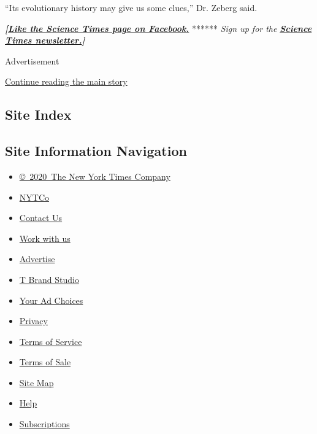 ``Its evolutionary history may give us some clues,'' Dr. Zeberg said.

\textbf{\emph{{[}}\href{http://on.fb.me/1paTQ1h}{\emph{Like the Science
Times page on Facebook.}}} ****** \emph{\textbar{} Sign up for the}
\textbf{\href{http://nyti.ms/1MbHaRU}{\emph{Science Times
newsletter.}}\emph{{]}}}

Advertisement

\protect\hyperlink{after-bottom}{Continue reading the main story}

\hypertarget{site-index}{%
\subsection{Site Index}\label{site-index}}

\hypertarget{site-information-navigation}{%
\subsection{Site Information
Navigation}\label{site-information-navigation}}

\begin{itemize}
\tightlist
\item
  \href{https://help.nytimes3xbfgragh.onion/hc/en-us/articles/115014792127-Copyright-notice}{©~2020~The
  New York Times Company}
\end{itemize}

\begin{itemize}
\tightlist
\item
  \href{https://www.nytco.com/}{NYTCo}
\item
  \href{https://help.nytimes3xbfgragh.onion/hc/en-us/articles/115015385887-Contact-Us}{Contact
  Us}
\item
  \href{https://www.nytco.com/careers/}{Work with us}
\item
  \href{https://nytmediakit.com/}{Advertise}
\item
  \href{http://www.tbrandstudio.com/}{T Brand Studio}
\item
  \href{https://www.nytimes3xbfgragh.onion/privacy/cookie-policy\#how-do-i-manage-trackers}{Your
  Ad Choices}
\item
  \href{https://www.nytimes3xbfgragh.onion/privacy}{Privacy}
\item
  \href{https://help.nytimes3xbfgragh.onion/hc/en-us/articles/115014893428-Terms-of-service}{Terms
  of Service}
\item
  \href{https://help.nytimes3xbfgragh.onion/hc/en-us/articles/115014893968-Terms-of-sale}{Terms
  of Sale}
\item
  \href{https://spiderbites.nytimes3xbfgragh.onion}{Site Map}
\item
  \href{https://help.nytimes3xbfgragh.onion/hc/en-us}{Help}
\item
  \href{https://www.nytimes3xbfgragh.onion/subscription?campaignId=37WXW}{Subscriptions}
\end{itemize}
